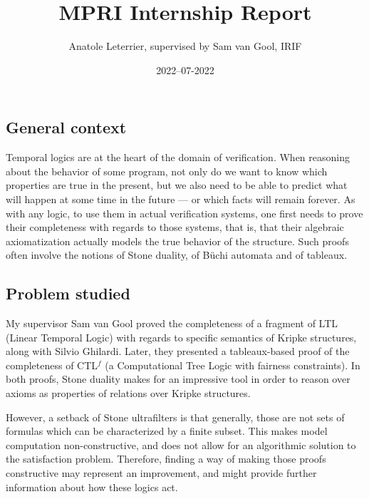 \documentclass[11pt]{article}
\title{MPRI Internship Report}
\author{Anatole Leterrier, supervised by Sam van Gool, IRIF}
\date{2022–07-2022}
\newcommand{\CTLf}{{CTL$^f$ }}
\begin{document}
\maketitle

\section*{}

\subsection*{General context}
Temporal logics are at the heart of the domain of verification.
When reasoning about the behavior of some program, not only do we want 
to know which properties are true in the present, but we also need 
to be able to predict what will happen at some time in the future --- 
or which facts will remain forever. As  with any logic, to use them  
in actual verification systems, one first needs to prove their completeness 
with regards to those systems, that is, that 
their algebraic axiomatization actually models the true behavior 
of the structure. Such proofs often involve the notions of Stone duality, 
of Büchi automata and of tableaux.

\subsection*{Problem studied}
My supervisor Sam van Gool proved the completeness of a fragment of LTL
(Linear Temporal Logic) with regards to specific semantics of Kripke
structures, along with Silvio Ghilardi. Later, they presented a tableaux-based
proof of the completeness of \CTLf(a Computational Tree Logic with
fairness constraints). In both proofs, Stone duality makes for an 
impressive tool in order to reason over axioms as properties of
relations over Kripke structures. 

However, a setback of Stone ultrafilters
is that generally, those are not sets of formulas which can be characterized
by a finite subset. This makes model computation non-constructive,
and does not allow for an algorithmic solution to the satisfaction problem. 
Therefore, finding a way of making those proofs constructive may represent
an improvement, and might provide further information about how these
logics act.
\end{document}
